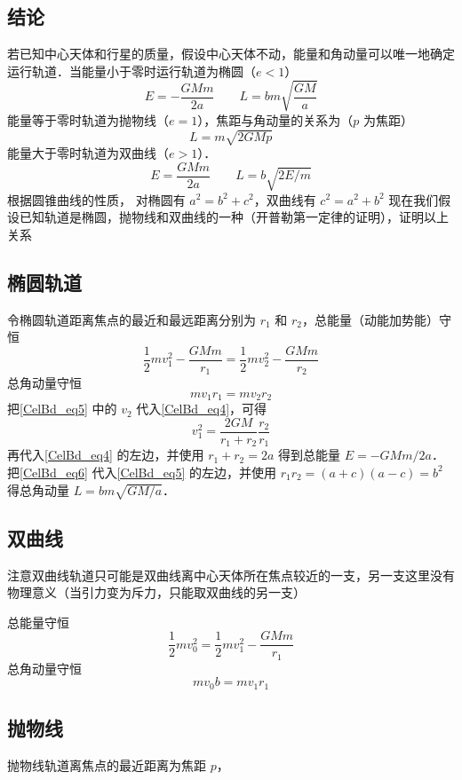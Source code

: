 

\subsection{结论}
若已知中心天体和行星的质量，假设中心天体不动，能量和角动量可以唯一地确定运行轨道．当能量小于零时运行轨道为椭圆（$e<1$）
\begin{equation}
E=-\frac{GMm}{2a} \qquad  L = bm\sqrt {\frac{{GM}}{a}}
\end{equation}
能量等于零时轨道为抛物线（$e=1$），焦距与角动量的关系为（$p$ 为焦距）
\begin{equation}
L = m\sqrt{2GMp}
\end{equation}
能量大于零时轨道为双曲线（$e>1$）．
\begin{equation}
E=\frac{GMm}{2a}  \qquad  L = b\sqrt{2E/m}
\end{equation}
根据圆锥曲线的性质，%
对椭圆有 $a^2=b^2+c^2$，双曲线有 $c^2=a^2+b^2$
现在我们假设已知轨道是椭圆，抛物线和双曲线的一种（开普勒第一定律的证明），证明以上关系

\subsection{椭圆轨道}
令椭圆轨道距离焦点的最近和最远距离分别为 $r_1$ 和 $r_2$，总能量（动能加势能）守恒
\begin{equation}\label{CelBd_eq4}
\frac{1}{2}mv_1^2 - \frac{GMm}{r_1} = \frac{1}{2}mv_2^2 - \frac{GMm}{r_2}
\end{equation}
总角动量守恒
\begin{equation}\label{CelBd_eq5}
mv_1 r_1 = mv_2 r_2
\end{equation}
把\autoref{CelBd_eq5} 中的 $v_2$ 代入\autoref{CelBd_eq4}，可得
\begin{equation}\label{CelBd_eq6}
v_1^2 = \frac{{2GM}}{{{r_1} + {r_2}}}\frac{{{r_2}}}{{{r_1}}}
\end{equation}
再代入\autoref{CelBd_eq4} 的左边，并使用 $r_1+r_2=2a$ %
得到总能量 $E=-{GMm}/{2a}$．把\autoref{CelBd_eq6} 代入\autoref{CelBd_eq5} 的左边，并使用 $r_1 r_2 = (a+c)(a-c) =b^2$ %
得总角动量 $L = bm\sqrt {GM/a}$．

\subsection{双曲线}
注意双曲线轨道只可能是双曲线离中心天体所在焦点较近的一支，另一支这里没有物理意义（当引力变为斥力，只能取双曲线的另一支）

总能量守恒
\begin{equation}
\frac{1}{2}mv_0^2 = \frac{1}{2}mv_1^2 - \frac{GMm}{r_1}
\end{equation}
总角动量守恒
\begin{equation}
mv_0b = mv_1r_1
\end{equation}

\subsection{抛物线}
抛物线轨道离焦点的最近距离为焦距 $p$，

